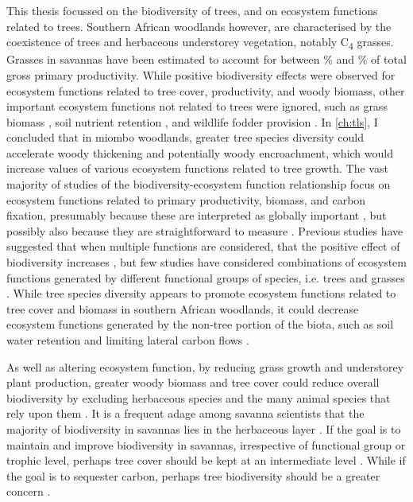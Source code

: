 \begin{refsection}
This thesis focussed on the biodiversity of trees, and on ecosystem functions related to trees. Southern African woodlands however, are characterised by the coexistence of trees and herbaceous understorey vegetation, notably C\textsubscript{4} grasses. Grasses in savannas have been estimated to account for between \% \citep{} and \% \citep{} of total gross primary productivity. While positive biodiversity effects were observed for ecosystem functions related to tree cover, productivity, and woody biomass, other important ecosystem functions not related to trees were ignored, such as grass biomass \citep{}, soil nutrient retention \citep{}, and wildlife fodder provision \citep{}. In \autoref{ch:tls}, I concluded that in miombo woodlands, greater tree species diversity could accelerate woody thickening and potentially woody encroachment, which would increase values of various ecosystem functions related to tree growth. The vast majority of studies of the biodiversity-ecosystem function relationship focus on ecosystem functions related to primary productivity, biomass, and carbon fixation, presumably because these are interpreted as globally important \citep{}, but possibly also because they are straightforward to measure \citep{}. Previous studies have suggested that when multiple functions are considered, that the positive effect of biodiversity increases \citep{Hector2007}, but few studies have considered combinations of ecosystem functions generated by different functional groups of species, i.e. trees and grasses \citep{}. While tree species diversity appears to promote ecosystem functions related to tree cover and biomass in southern African woodlands, it could decrease ecosystem functions generated by the non-tree portion of the biota, such as soil water retention and limiting lateral carbon flows \citep{}.

As well as altering ecosystem function, by reducing grass growth and understorey plant production, greater woody biomass and tree cover could reduce overall biodiversity by excluding herbaceous species and the many animal species that rely upon them \citep{}. It is a frequent adage among savanna scientists that the majority of biodiversity in savannas lies in the herbaceous layer \citep{}. If the goal is to maintain and improve biodiversity in savannas, irrespective of functional group or trophic level, perhaps tree cover should be kept at an intermediate level \citep{}. While if the goal is to sequester carbon, perhaps tree biodiversity should be a greater concern \citep{}.


\end{refsection}
